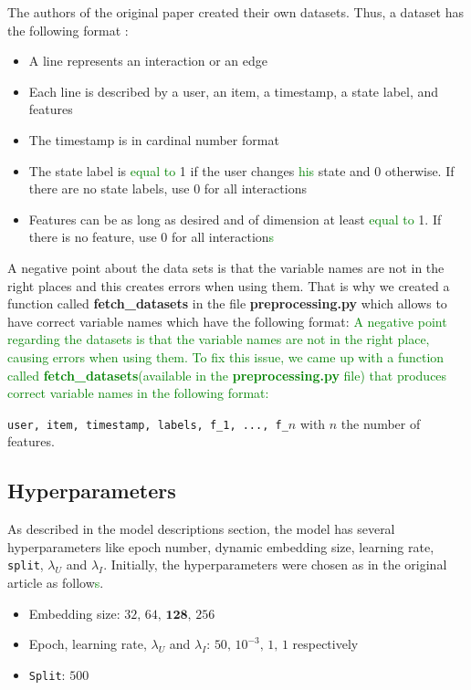 The authors of the original paper created their own datasets. Thus, a dataset has the following format :
\begin{itemize}
    \item A line represents an interaction or an edge
    \item Each line is described by a user, an item, a timestamp, a state label, and features
    \item The timestamp is in cardinal number format
    \item The state label is \textcolor{green}{equal to} 1 if the user changes \textcolor{green}{his} state and 0 otherwise. If there are no state labels, use 0 for all interactions
    \item Features can be as long as desired and of dimension at least \textcolor{green}{equal to} 1. If there is no feature, use 0 for all interaction\textcolor{green}{s}
\end{itemize}
A negative point about the data sets is that the variable names are not in the right places and this creates errors when using them. That is why we created a function called \textbf{fetch\_datasets} in the file \textbf{preprocessing.py} which allows to have correct variable names which have the following format: 
\textcolor{green}{
A negative point regarding the datasets is that the variable names are not in the right place, causing errors when using them. To fix this issue, we came up with a function called \textbf{fetch\_datasets}(available in the \textbf{preprocessing.py} file) that produces correct variable names in the following format:}

\texttt{user, item, timestamp, labels, f\_1, ..., f\_$n$} with $n$ the number of features.\\

\subsection{Hyperparameters}

As described in the model descriptions section, the model has several hyperparameters like epoch number, dynamic embedding size, learning rate, \texttt{split}, $\lambda_U$ and $\lambda_I$. Initially, the hyperparameters were chosen as in the original article as follow\textcolor{green}{s}.

\begin{itemize}
    \item Embedding size: $32, \, 64, \, \textbf{128}, \, 256$
    \item Epoch, learning rate, $\lambda_U$ and $\lambda_I$: $50, \, 10^{-3}, \, 1, \, 1$ respectively
    \item \texttt{Split}: $500$
\end{itemize}

